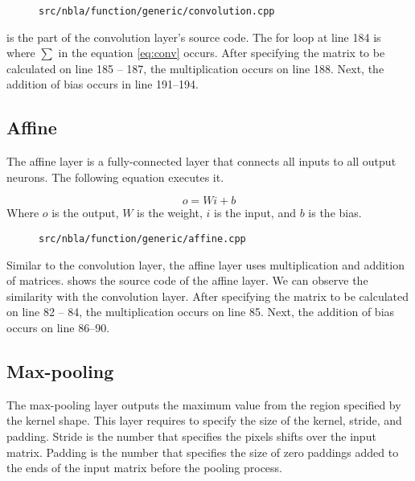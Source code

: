 \begin{figure}[tbp]
  \centering
  
  \caption{\texttt{src/nbla/function/generic/convolution.cpp}}
  \label{fig:code_convolution}
\end{figure}


 is the part of the convolution layer's source code.  The for loop at line 184 is where $\sum$ in the equation \ref{eq:conv} occurs. After specifying the matrix to be calculated on line 185 -- 187, the multiplication occurs on line 188. Next, the addition of bias occurs in line 191--194.


\subsection{Affine}
The affine layer is a fully-connected layer that connects all inputs to all output neurons. The following equation executes it.

\[
  o = Wi + b
\]
Where $o$ is the output, $W$ is the weight, $i$ is the input, and $b$ is the bias.

\begin{figure}[tbp]
  \centering
  
  \caption{\texttt{src/nbla/function/generic/affine.cpp}}
  \label{fig:code_affine}
\end{figure}

Similar to the convolution layer, the affine layer uses multiplication and addition of matrices.  shows the source code of the affine layer. We can observe the similarity with the convolution layer. After specifying the matrix to be calculated on line 82 -- 84, the multiplication occurs on line 85. Next, the addition of bias occurs on line 86--90.

\subsection{Max-pooling}
The max-pooling layer outputs the maximum value from the region specified by the kernel shape. This layer requires to specify the size of the kernel, stride, and padding. Stride is the number that specifies the pixels shifts over the input matrix. Padding is the number that specifies the size of zero paddings added to the ends of the input matrix before the pooling process.




